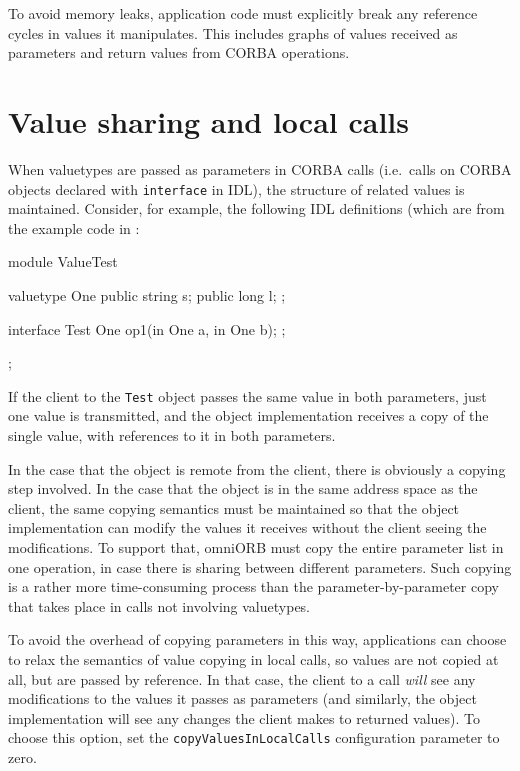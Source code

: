 \documentclass[11pt,oneside,a4paper]{book}
\newcommand{\type}[1]{\texttt{#1}}
\newcommand{\code}[1]{\texttt{#1}}
\begin{document}
To avoid memory leaks, application code must explicitly break any
reference cycles in values it manipulates. This includes graphs of
values received as parameters and return values from CORBA operations.


\section{Value sharing and local calls}

When valuetypes are passed as parameters in CORBA calls (i.e.\ calls
on CORBA objects declared with \code{interface} in IDL), the structure
of related values is maintained. Consider, for example, the following
IDL definitions (which are from the example code in
:

\begin{idllisting}
module ValueTest {
  valuetype One {
    public string s;
    public long   l;
  };

  interface Test {
    One op1(in One a, in One b);
  };
};
\end{idllisting}

If the client to the \type{Test} object passes the same value in both
parameters, just one value is transmitted, and the object
implementation receives a copy of the single value, with references to
it in both parameters.

In the case that the object is remote from the client, there is
obviously a copying step involved. In the case that the object is in
the same address space as the client, the same copying semantics must
be maintained so that the object implementation can modify the values
it receives without the client seeing the modifications. To support
that, omniORB must copy the entire parameter list in one operation, in
case there is sharing between different parameters. Such copying is a
rather more time-consuming process than the parameter-by-parameter
copy that takes place in calls not involving valuetypes.

To avoid the overhead of copying parameters in this way, applications
can choose to relax the semantics of value copying in local calls, so
values are not copied at all, but are passed by reference. In that
case, the client to a call \emph{will} see any modifications to the
values it passes as parameters (and similarly, the object
implementation will see any changes the client makes to returned
values). To choose this option, set the \code{copyValuesInLocalCalls}
configuration parameter to zero.
\end{document}

